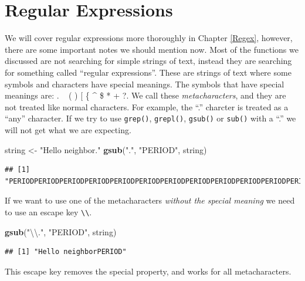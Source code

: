 \documentclass[
]{book}
\newenvironment{Shaded}{\begin{snugshade}}{\end{snugshade}}
\newcommand{\CharTok}[1]{\textcolor[rgb]{0.31,0.60,0.02}{#1}}
\newcommand{\KeywordTok}[1]{\textcolor[rgb]{0.13,0.29,0.53}{\textbf{#1}}}
\newcommand{\NormalTok}[1]{#1}
\newcommand{\StringTok}[1]{\textcolor[rgb]{0.31,0.60,0.02}{#1}}
\begin{document}
\hypertarget{regular-expressions}{%
\section{Regular Expressions}\label{regular-expressions}}

We will cover regular expressions more thoroughly in Chapter \ref{Regex}, however, there are some important notes we should mention now. Most of the functions we discussed are not searching for simple strings of text, instead they are searching for something called ``regular expressions''. These are strings of text where some symbols and characters have special meanings. The symbols that have special meanings are: . ~\textbar{} ( ) {[} \{ \^{} \$ * + ?. We call these \emph{metacharacters}, and they are not treated like normal characters. For example, the ``.'' charcter is treated as a ``any'' character. If we try to use \texttt{grep()}, \texttt{grepl()}, \texttt{gsub()} or \texttt{sub()} with a ``.'' we will not get what we are expecting.

\begin{Shaded}
\begin{Highlighting}[]
\NormalTok{string <-}\StringTok{ "Hello neighbor."}
\KeywordTok{gsub}\NormalTok{(}\StringTok{"."}\NormalTok{, }\StringTok{"PERIOD"}\NormalTok{, string)}
\end{Highlighting}
\end{Shaded}

\begin{verbatim}
## [1] "PERIODPERIODPERIODPERIODPERIODPERIODPERIODPERIODPERIODPERIODPERIODPERIODPERIODPERIODPERIOD"
\end{verbatim}

If we want to use one of the metacharacters \emph{without the special meaning} we need to use an escape key \texttt{\textbackslash{}\textbackslash{}}.

\begin{Shaded}
\begin{Highlighting}[]
\KeywordTok{gsub}\NormalTok{(}\StringTok{"}\CharTok{\textbackslash{}\textbackslash{}}\StringTok{."}\NormalTok{, }\StringTok{"PERIOD"}\NormalTok{, string)}
\end{Highlighting}
\end{Shaded}

\begin{verbatim}
## [1] "Hello neighborPERIOD"
\end{verbatim}

This escape key removes the special property, and works for all metacharacters.
\end{document}
